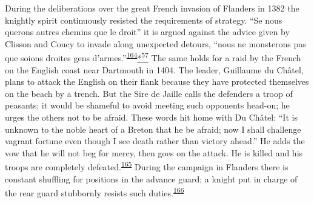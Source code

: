 During the deliberations over the great French invasion of Flanders in
1382 the knightly spirit continuously resisted the requirements of
strategy. ``Se nous querons autres chemins que le droit'' it is argued
against the advice given by Clisson and Coucy to invade
\protect\hypertarget{10_Chapter_Three__THE_HEROIC_DREAM.xhtmlux5cux23page_112}{}{}along
unexpected detours, ``nous ne monsterons pas que soions droites gens
d'armes.''\textsuperscript{\protect\hypertarget{10_Chapter_Three__THE_HEROIC_DREAM.xhtmlux5cux23id_1608}{\protect\hyperlink{23_NOTES.xhtmlux5cux23id_1609}{164}}}\protect\hypertarget{10_Chapter_Three__THE_HEROIC_DREAM.xhtmlux5cux23id_2901}{\protect\hyperlink{23_NOTES.xhtmlux5cux23id_2902}{*\textsuperscript{57}}}
The same holds for a raid by the French on the English coast near
Dartmouth in 1404. The leader, Guillaume du Châtel, plans to attack the
English on their flank because they have protected themselves on the
beach by a trench. But the Sire de Jaille calls the defenders a troop of
peasants; it would be shameful to avoid meeting such opponents head-on;
he urges the others not to be afraid. These words hit home with Du
Châtel: ``It is unknown to the noble heart of a Breton that he be
afraid; now I shall challenge vagrant fortune even though I see death
rather than victory ahead.'' He adds the vow that he will not beg for
mercy, then goes on the attack. He is killed and his troops are
completely
defeated.\textsuperscript{\protect\hypertarget{10_Chapter_Three__THE_HEROIC_DREAM.xhtmlux5cux23id_1606}{\protect\hyperlink{23_NOTES.xhtmlux5cux23id_1607}{165}}}
During the campaign in Flanders there is constant shuffling for
positions in the advance guard; a knight put in charge of the rear guard
stubbornly resists such
duties.\textsuperscript{\protect\hypertarget{10_Chapter_Three__THE_HEROIC_DREAM.xhtmlux5cux23id_1604}{\protect\hyperlink{23_NOTES.xhtmlux5cux23id_1605}{166}}}

